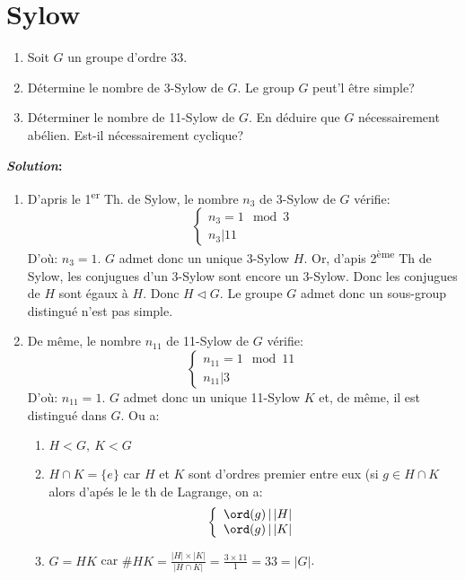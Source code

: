 \section{Sylow}

\begin{examplebox}
	\begin{enumerate}
		\item Soit $G$ un groupe d'ordre 33.	
		\item Détermine le nombre de 3-Sylow de $G$. Le group $G$ peut'l être simple?
		\item Déterminer le nombre de 11-Sylow de $G$. En déduire que $G$ nécessairement abélien. Est-il nécessairement cyclique?
	\end{enumerate}
		\textbf{\emph{Solution}:}

	\begin{enumerate}
		\item D'apris le 1\textsuperscript{er} Th. de Sylow, le nombre $n_3$ de 3-Sylow de $G$ vérifie:
		$$\left\{\begin{array}{r}n_3 = 1\mod 3\\n_3 | 11\end{array}\right.$$
		D'où: $n_3=1$. $G$ admet donc un unique 3-Sylow $H$. Or, d'apis 2\textsuperscript{ème} Th de Sylow, les conjugues d'un 3-Sylow sont encore un 3-Sylow. Donc les conjugues de $H$ sont égaux à $H$. Donc $H\lhd G$. Le groupe $G$ admet donc un sous-group distingué n'est pas simple.
		
		\item De même, le nombre $n_{11}$ de 11-Sylow de $G$ vérifie:
		$$\left\{\begin{array}{r}n_{11} = 1\mod 11\\n_{11} | 3\end{array}\right.$$
		D'où: $n_{11}=1$.
		$G$ admet donc un unique 11-Sylow $K$ et, de même, il est distingué dans $G$.
		Ou a:
		\begin{enumerate}
			\item $H<  G,\ K<  G$
			\item $H\cap K=\{e\}$ car $H$ et $K$ sont d'ordres premier entre eux (si $g\in H\cap K$ alors d'apés le le th de Lagrange, on a:
			$$\left\{\begin{array}{r}\ord(g)\,|\, |H|\\\ord(g)\,|\, |K|\end{array}\right.$$
			\item $G=HK$ car $\#HK=\frac{|H|\times|K|}{|H\cap K|}=\frac{3\times 11}{1}=33=|G|$. 
		\end{enumerate}


\end{enumerate}
\end{examplebox}
